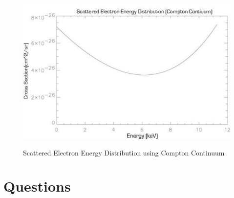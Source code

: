 \documentclass{../lab}
\begin{document}
\begin{enumerate}
    \begin{figure}[h]
        \centering
        \href{http://experimentationlab.berkeley.edu/sites/default/files/images/550px-COMimage014.jpg}{\includegraphics[width=0.7\linewidth]{images/550px-COMimage014.jpg}}
        \caption{Scattered Electron Energy Distribution using Compton Continuum}
        \label{fig:550px-COMimage014}
    \end{figure}

\end{enumerate}

\section{Questions}
\end{document}
